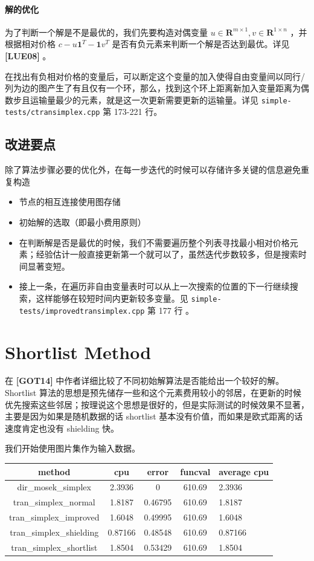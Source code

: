 \documentclass[]{article}
\let\oldparagraph\paragraph
\renewcommand{\paragraph}[1]{\oldparagraph{#1}\mbox{}}
\begin{document}
\paragraph{解的优化}

为了判断一个解是不是最优的，我们先要构造对偶变量
\(u \in \mathbf{R}^{m\times 1},v\in \mathbf{R}^{1\times n}\)
，并根据相对价格 \(c - u \mathbf{1}^T - \mathbf{1}v^T\)
是否有负元素来判断一个解是否达到最优。详见 \textbf{{[}LUE08{]}} 。

在找出有负相对价格的变量后，可以断定这个变量的加入使得自由变量间以同行/列为边的图产生了有且仅有一个环，那么，找到这个环上距离新加入变量距离为偶数步且运输量最少的元素，就是这一次更新需要更新的运输量。详见
\texttt{simple-tests/ctransimplex.cpp} 第 173-221 行。

\subsection{改进要点}

除了算法步骤必要的优化外，在每一步迭代的时候可以存储许多关键的信息避免重复构造

\begin{itemize}
\item
  节点的相互连接使用图存储
\item
  初始解的选取（即最小费用原则）
\item
  在判断解是否是最优的时候，我们不需要遍历整个列表寻找最小相对价格元素；经验估计一般直接更新第一个就可以了，虽然迭代步数较多，但是搜索时间显著变短。
\item
  接上一条，在遍历非自由变量表时可以从上一次搜索的位置的下一行继续搜索，这样能够在较短时间内更新较多变量。见
  \texttt{simple-tests/improvedtransimplex.cpp} 第 177 行 。
\end{itemize}

\section{Shortlist Method}

在 \textbf{{[}GOT14{]}}
中作者详细比较了不同初始解算法是否能给出一个较好的解。 Shortlist
算法的思想是预先储存一些和这个元素费用较小的邻居，在更新的时候优先搜索这些邻居；按理说这个思想是很好的，但是实际测试的时候效果不显著，主要是因为如果是随机数据的话
shortlist 基本没有价值，而如果是欧式距离的话速度肯定也没有 shielding
快。

我们开始使用图片集作为输入数据。

\begin{longtable}[]{@{}c|cccl@{}}
\hline
method & cpu & error & funcval & average cpu\tabularnewline

\hline
dir\_mosek\_simplex & 2.3936 & 0 & 610.69 & 2.3936\tabularnewline
tran\_simplex\_normal & 1.8187 & 0.46795 & 610.69 &
1.8187\tabularnewline
tran\_simplex\_improved & 1.6048 & 0.49995 & 610.69 &
1.6048\tabularnewline
tran\_simplex\_shielding & 0.87166 & 0.48548 & 610.69 &
0.87166\tabularnewline
tran\_simplex\_shortlist & 1.8504 & 0.53429 & 610.69 &
1.8504\tabularnewline
\hline
\end{longtable}
\end{document}
